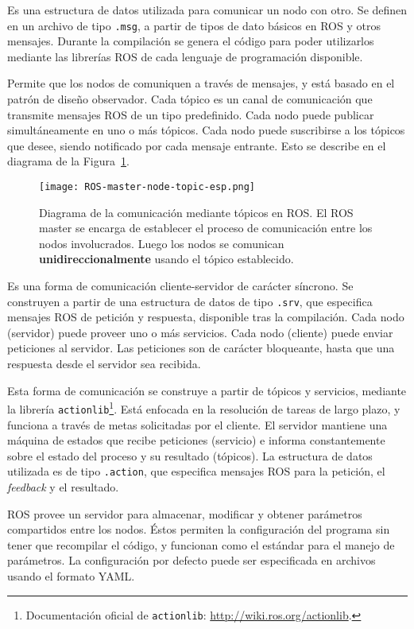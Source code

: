 Es una estructura de datos utilizada para comunicar un nodo con otro. Se definen en un archivo de tipo \texttt{.msg}, a partir de tipos de dato básicos en ROS y otros mensajes. Durante la compilación se genera el código para poder utilizarlos mediante las librerías ROS de cada lenguaje de programación disponible.

 Permite que los nodos de comuniquen a través de mensajes, y está basado en el patrón de diseño observador. Cada tópico es un canal de comunicación que transmite mensajes ROS de un tipo predefinido. Cada nodo puede publicar simultáneamente en uno o más tópicos. Cada nodo puede suscribirse a los tópicos que desee, siendo notificado por cada mensaje entrante. Esto se describe en el diagrama de la Figura~\ref{img:ros-topic}.

\begin{figure}[!h]
	\centering
	\texttt{[image: ROS-master-node-topic-esp.png]}
	\caption{\small Diagrama de la comunicación mediante tópicos en ROS. El ROS master se encarga de establecer el proceso de comunicación entre los nodos involucrados. Luego los nodos se comunican {\bfseries unidireccionalmente} usando el tópico establecido.}
	\label{img:ros-topic}
\end{figure}

 Es una forma de comunicación cliente-servidor de carácter síncrono. Se construyen a partir de una estructura de datos de tipo \texttt{.srv}, que especifica mensajes ROS de petición y respuesta, disponible tras la compilación. Cada nodo (servidor) puede proveer uno o más servicios. Cada nodo (cliente) puede enviar peticiones al servidor. Las peticiones son de carácter bloqueante, hasta que una respuesta desde el servidor sea recibida.

 Esta forma de comunicación se construye a partir de tópicos y servicios, mediante la librería \texttt{actionlib}\footnote{Documentación oficial de \texttt{actionlib}: \url{http://wiki.ros.org/actionlib}.}. Está enfocada en la resolución de tareas de largo plazo, y funciona a través de metas solicitadas por el cliente. El servidor mantiene una máquina de estados que recibe peticiones (servicio) e informa constantemente sobre el estado del proceso y su resultado (tópicos). La estructura de datos utilizada es de tipo \texttt{.action}, que especifica mensajes ROS para la petición, el \textit{feedback} y el resultado.

 ROS provee un servidor para almacenar, modificar y obtener parámetros compartidos entre los nodos. Éstos permiten la configuración del programa sin tener que recompilar el código, y funcionan como el estándar para el manejo de parámetros. La configuración por defecto puede ser especificada en archivos usando el formato YAML.


